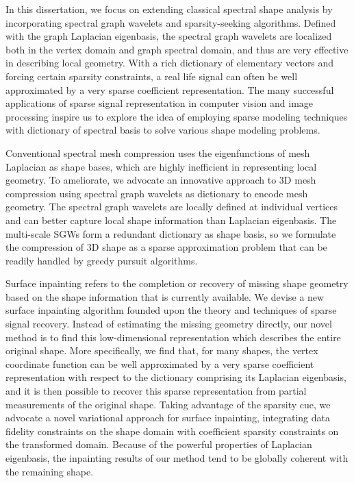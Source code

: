 \documentclass[12pt,letterpaper,twosided]{report}
\numberwithin{equation}{section}
\begin{document}
\onehalfspacing

In this dissertation, we focus on extending classical spectral shape analysis
by incorporating spectral graph wavelets and sparsity-seeking
algorithms. Defined with the graph Laplacian eigenbasis, the spectral graph
wavelets are localized both in the vertex domain and graph spectral
domain, and thus are very effective in describing local geometry.
With a rich dictionary of elementary vectors and forcing certain sparsity
constraints, a real life signal can often be well approximated by a very sparse
coefficient representation. The many successful applications of sparse signal
representation in computer vision and image processing inspire us to explore the
idea of employing sparse modeling techniques with dictionary of spectral basis to
solve various shape modeling problems.

Conventional spectral mesh compression uses the eigenfunctions of mesh
Laplacian as shape bases, which are highly inefficient in representing local
geometry. To ameliorate, we advocate an innovative approach to 3D mesh
compression using spectral graph wavelets as dictionary to encode mesh geometry.
The spectral graph wavelets are locally defined at individual vertices and can
better capture local shape information than Laplacian eigenbasis. The
multi-scale SGWs form a redundant dictionary as shape basis, so we formulate
the compression of 3D shape as a sparse approximation problem that can be
readily handled by greedy pursuit algorithms.

Surface inpainting refers to the completion or recovery of missing shape
geometry based on the shape information that is currently available. We
devise a new surface inpainting algorithm founded upon the theory and
techniques of sparse signal recovery. Instead of estimating the missing
geometry directly, our novel method is to find this low-dimensional
representation which describes the entire original shape. More specifically,
we find that, for many shapes, the vertex coordinate function can be well
approximated by a very sparse coefficient representation with respect to the
dictionary comprising its Laplacian eigenbasis, and it is then possible to
recover this sparse representation from partial measurements of the original
shape. Taking advantage of the sparsity cue, we advocate a novel variational
approach for surface inpainting, integrating data fidelity constraints on the
shape domain with coefficient sparsity constraints on the transformed domain.
Because of the powerful properties of Laplacian eigenbasis, the inpainting
results of our method tend to be globally coherent with the remaining shape.
\end{document}
